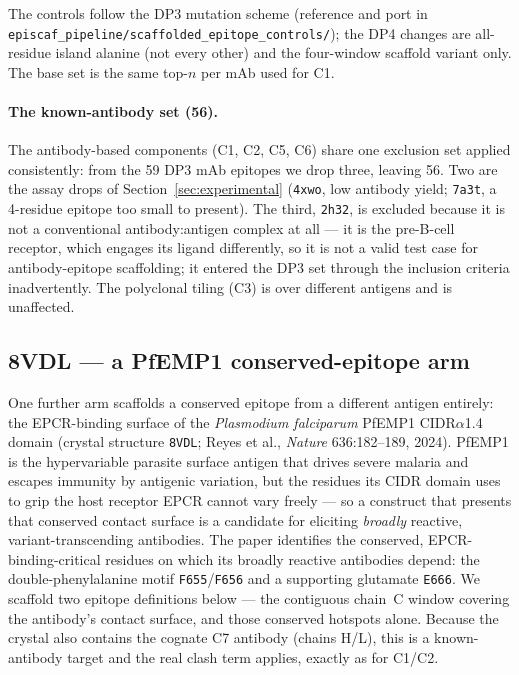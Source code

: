 \medskip
\noindent The controls follow the DP3 mutation scheme (reference and port in
\texttt{episcaf\_pipeline/scaffolded\_epitope\_controls/}); the DP4 changes are all-residue island
alanine (not every other) and the four-window scaffold variant only. The base set is the same top-$n$
per mAb used for C1.

\paragraph{The known-antibody set (\num{56}).} The antibody-based components (C1, C2, C5, C6) share one
exclusion set applied consistently: from the \num{59} DP3 mAb epitopes we drop three, leaving \num{56}.
Two are the assay drops of Section~\ref{sec:experimental} (\texttt{4xwo}, low antibody yield;
\texttt{7a3t}, a \num{4}-residue epitope too small to present). The third, \texttt{2h32}, is excluded
because it is not a conventional antibody:antigen complex at all --- it is the pre-B-cell receptor, which
engages its ligand differently, so it is not a valid test case for antibody-epitope scaffolding; it
entered the DP3 set through the inclusion criteria inadvertently. The polyclonal tiling (C3) is over
different antigens and is unaffected.

\subsection{8VDL --- a PfEMP1 conserved-epitope arm}\label{sec:dp4_8vdl}
One further arm scaffolds a conserved epitope from a different antigen entirely: the EPCR-binding
surface of the \emph{Plasmodium falciparum} PfEMP1 CIDR$\alpha$1.4 domain (crystal structure
\texttt{8VDL}; Reyes et al., \emph{Nature} 636:182--189, 2024). PfEMP1 is the hypervariable parasite
surface antigen that drives severe malaria and escapes immunity by antigenic variation, but the
residues its CIDR domain uses to grip the host receptor EPCR cannot vary freely --- so a construct that
presents that conserved contact surface is a candidate for eliciting \emph{broadly} reactive,
variant-transcending antibodies. The paper identifies the conserved, EPCR-binding-critical residues on
which its broadly reactive antibodies depend: the double-phenylalanine motif \texttt{F655}/\texttt{F656}
and a supporting glutamate \texttt{E666}. We scaffold two epitope definitions below --- the contiguous
chain~C window covering the antibody's contact surface, and those conserved hotspots alone. Because the
crystal also contains the cognate C7 antibody (chains H/L), this is a known-antibody target and the real
clash term applies, exactly as for C1/C2.

